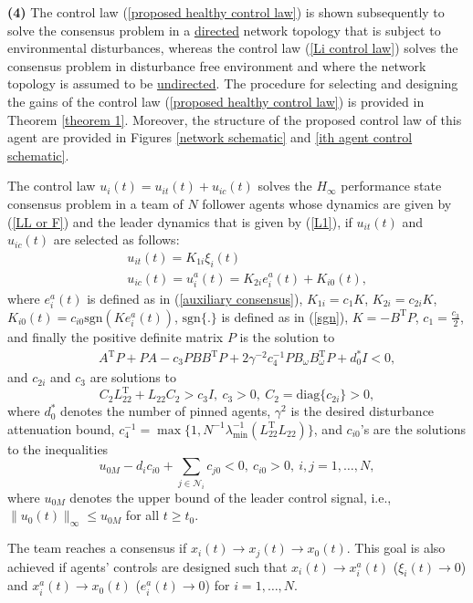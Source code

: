 \documentclass[12pt,draftcls,onecolumn]{IEEEtran}
\begin{document}
 \textbf{(4)} The control law (\ref{proposed healthy control law}) is shown subsequently to solve the consensus problem in a \underline{directed} network topology that is {subject to environmental disturbances}, whereas the control law (\ref{Li control law}) solves the consensus problem in {disturbance free} environment and where the network topology is assumed to be \underline{undirected}. The procedure for selecting and designing the gains of the control law (\ref{proposed healthy control law}) is provided in Theorem \ref{theorem 1}.  Moreover, 
the structure of the proposed control law of this agent are provided in Figures \ref{network schematic} and \ref{ith agent control schematic}. \begin{theorems}\label{theorem 1}
	The control law 
	$u_i(t)=u_{it}(t)+u_{ic}(t)$
	 solves the $H_{\infty}$ performance state consensus problem in a team of $N$ follower agents whose dynamics are given by (\ref{LL or F}) and the leader dynamics that is given by (\ref{L1}), if $u_{it}(t)$ and $u_{ic}(t)$ are selected as follows:
	\begin{eqnarray*}
	&&u_{it}(t)=K_{1i}\xi_i(t)\\
	&&u_{ic}(t)=u_i^a(t)=K_{2i}e_i^a(t)+K_{i0}(t),
	\end{eqnarray*}
	 where $e_i^a(t)$ is  defined as in (\ref{auxiliary consensus}), 
	$K_{1i}=c_1K$, $K_{2i}=c_{2i}K$, $K_{i0}(t)=c_{i0}\text{sgn}(Ke_i^a(t))$, $\text{sgn}\{.\}$ is  defined as in (\ref{sgn}), $K=-B^{\text{T}}P$,   $c_1=\frac{c_3}{2}$, and finally the positive definite matrix $P$ is the solution to
	\begin{eqnarray*}
		&&A^{\text{T}}P+PA- c_3PBB^{\text{T}}P+2\gamma^{-2}c_4^{-1}PB_{\omega}B_{\omega}^{\text{T}}P+d_0^*I<0, 
	\end{eqnarray*}
	and $c_{2i}$ and $c_3$ are solutions to
	$$C_2L_{22}^{\text{T}}+L_{22}C_2>c_3I,\ c_3>0,\ C_2=\text{diag}\{c_{2i}\}>0,$$
	where $d_0^*$ denotes the number of pinned agents, $\gamma^2$ is the desired disturbance attenuation bound,  $c_4^{-1}=\max\{1,N^{-1}\lambda_{\text{min}}^{-1}(L_{22}^{\text{T}}L_{22})\}$,   
	and $ c_{i0}$'s are the solutions to the inequalities
	$$
	u_{0M}-d_ic_{i0}+\sum_{j\in\mathcal{N}_i}c_{j0} < 0, \ c_{i0}>0,\ i,j=1,\dots,N,
	$$
	where $u_{0M}$ denotes the upper bound of the leader control signal, i.e., $\|u_0(t)\|_{\infty}\leq u_{0M}$ for all $t\geq t_0$.
\end{theorems}
\proof
The team reaches a consensus if $x_i(t)\to x_j(t)\to x_0(t)$. This goal is also achieved if agents' controls are designed such that $x_i(t)\to x_i^a(t)$ ($\xi_i(t)\to 0$) and $x_i^a(t)\to x_0(t)$ ($e_i^a(t)\to 0$) for $i=1,\dots,N$. 
\end{document}
